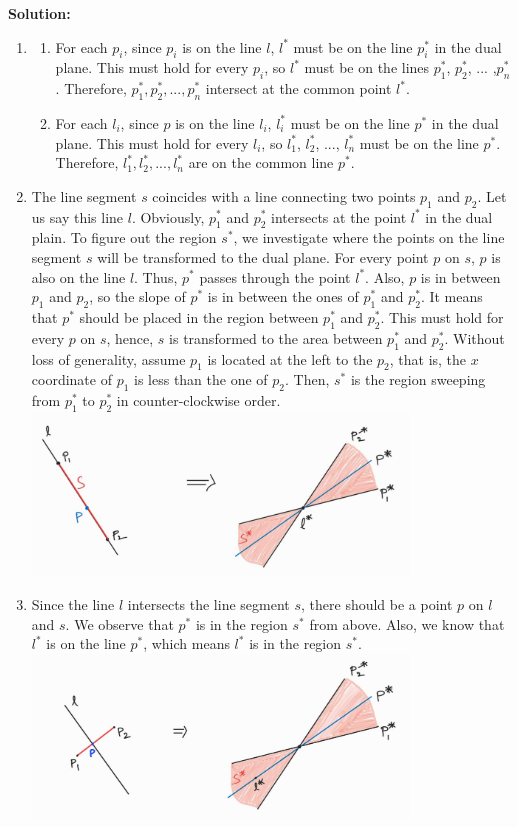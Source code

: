 \documentclass[11pt]{article}
\begin{document}
\begin{qunlist}
\textbf{Solution:} 
\begin{enumerate}
    \item
    \begin{enumerate}
        \item For each $p_i$, since $p_i$ is on the line $l$, $l^*$ must be on the line $p_i^*$ in the dual plane. This must hold for every $p_i$, so $l^*$ must be on the lines $p_1^*$, $p_2^*$, ... ,$p_n^*$. Therefore, $p_1^*, p_2^*, ..., p_n^*$ intersect at the common point $l^*$.
        \item For each $l_i$, since $p$ is on the line $l_i$, $l_i^*$ must be on the line $p^*$ in the dual plane. This must hold for every $l_i$, so $l_1^*$, $l_2^*$, ..., $l_n^*$ must be on the line $p^*$. Therefore, $l_1^*, l_2^*, ..., l_n^*$ are on the common line $p^*$.
    \end{enumerate}
    \item The line segment $s$ coincides with a line connecting two points $p_1$ and $p_2$. Let us say this line $l$. Obviously, $p_1^*$ and $p_2^*$ intersects at the point $l^*$ in the dual plain. To figure out the region $s^*$, we investigate where the points on the line segment $s$ will be transformed to the dual plane. For every point $p$ on $s$, $p$ is also on the line $l$. Thus, $p^*$ passes through the point $l^*$. Also, $p$ is in between $p_1$ and $p_2$, so the slope of $p^*$ is in between the ones of $p_1^*$ and $p_2^*$. It means that $p^*$ should be placed in the region between $p_1^*$ and $p_2^*$. This must hold for every $p$ on $s$, hence, $s$ is transformed to the area between $p_1^*$ and $p_2^*$. Without loss of generality, assume $p_1$ is located at the left to the $p_2$, that is, the $x$ coordinate of $p_1$ is less than the one of $p_2$. Then, $s^*$ is the region sweeping from $p_1^*$ to $p_2^*$ in counter-clockwise order. \\\includegraphics[width=100mm]{region1.jpg}
    \item Since the line $l$ intersects the line segment $s$, there should be a point $p$ on $l$ and $s$. We observe that $p^*$ is in the region $s^*$ from above. Also, we know that $l^*$ is on the line $p^*$, which means $l^*$ is in the region $s^*$.\\\includegraphics[width=100mm]{region2.jpg}
\end{enumerate}



\end{qunlist}
\end{document}
